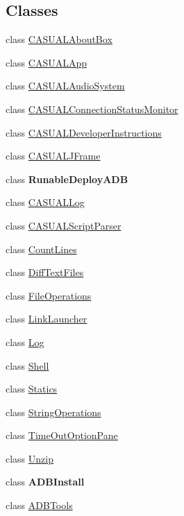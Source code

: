 \subsection*{Classes}
\begin{DoxyCompactItemize}
\item 
class \hyperlink{classCASUAL_1_1CASUALAboutBox}{C\-A\-S\-U\-A\-L\-About\-Box}
\item 
class \hyperlink{classCASUAL_1_1CASUALApp}{C\-A\-S\-U\-A\-L\-App}
\item 
class \hyperlink{classCASUAL_1_1CASUALAudioSystem}{C\-A\-S\-U\-A\-L\-Audio\-System}
\item 
class \hyperlink{classCASUAL_1_1CASUALConnectionStatusMonitor}{C\-A\-S\-U\-A\-L\-Connection\-Status\-Monitor}
\item 
class \hyperlink{classCASUAL_1_1CASUALDeveloperInstructions}{C\-A\-S\-U\-A\-L\-Developer\-Instructions}
\item 
class \hyperlink{classCASUAL_1_1CASUALJFrame}{C\-A\-S\-U\-A\-L\-J\-Frame}
\item 
class {\bfseries Runable\-Deploy\-A\-D\-B}
\item 
class \hyperlink{classCASUAL_1_1CASUALLog}{C\-A\-S\-U\-A\-L\-Log}
\item 
class \hyperlink{classCASUAL_1_1CASUALScriptParser}{C\-A\-S\-U\-A\-L\-Script\-Parser}
\item 
class \hyperlink{classCASUAL_1_1CountLines}{Count\-Lines}
\item 
class \hyperlink{classCASUAL_1_1DiffTextFiles}{Diff\-Text\-Files}
\item 
class \hyperlink{classCASUAL_1_1FileOperations}{File\-Operations}
\item 
class \hyperlink{classCASUAL_1_1LinkLauncher}{Link\-Launcher}
\item 
class \hyperlink{classCASUAL_1_1Log}{Log}
\item 
class \hyperlink{classCASUAL_1_1Shell}{Shell}
\item 
class \hyperlink{classCASUAL_1_1Statics}{Statics}
\item 
class \hyperlink{classCASUAL_1_1StringOperations}{String\-Operations}
\item 
class \hyperlink{classCASUAL_1_1TimeOutOptionPane}{Time\-Out\-Option\-Pane}
\item 
class \hyperlink{classCASUAL_1_1Unzip}{Unzip}
\item 
class {\bfseries A\-D\-B\-Install}
\item 
class \hyperlink{classCASUAL_1_1ADBTools}{A\-D\-B\-Tools}

\end{DoxyCompactItemize}
